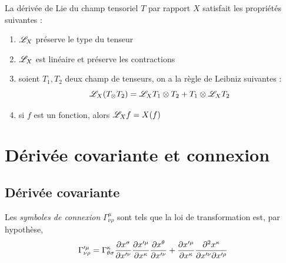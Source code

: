 \documentclass[a4paper,11pt]{report}
\begin{document}
            \begin{prop}
            \begin{leftbar}
                La dérivée de Lie du champ tensoriel $T$ par rapport $X$ satisfait les propriétés suivantes :
                \begin{enumerate}[label = \textit{\roman*)}]
                    \item $\mathscr{L}_X$ préserve le type du tenseur
                    \item $\mathscr{L}_X$ est linéaire et préserve les contractions
                    \item soient $T_1,T_2$ deux champ de tenseurs, on a la règle de Leibniz suivantes :
                    \begin{equation}
                        \mathscr{L}_X(T_\otimes T_2) = \mathscr{L}_X T_1\otimes T_2+T_1\otimes \mathscr{L}_X T_2
                    \end{equation}
                    \item si $f$ est un fonction, alors 
                    $\mathscr{L}_Xf = X(f)$
                \end{enumerate}
            \end{leftbar}
            \end{prop}
            
            \comp
            
        
        \section{Dérivée covariante et connexion}
        
            \subsection{Dérivée covariante}
        
                \begin{definition}
                    Les \textit{symboles de connexion} $\Gamma^\mu_{\nu\rho}$ sont tels que la loi de transformation est, par hypothèse,
                    \begin{equation}
                        \Gamma'^\mu_{\nu\rho} = \Gamma^\kappa_{\theta\sigma}\frac{\partial x^\sigma}{\partial x'^\nu} \frac{\partial x'^\mu}{\partial x^\kappa}\frac{\partial x^\theta}{\partial x'^\nu} +  \frac{\partial x'^\mu}{\partial x^\kappa}\frac{\partial^2 x^\kappa}{\partial x'^\nu\partial x'^\rho}
                    \end{equation}
                \end{definition}
                
\end{document}
